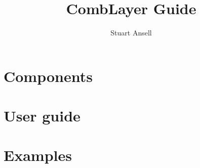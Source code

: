 \documentclass{article}
\title{CombLayer Guide}
\author{Stuart Ansell}
\begin{document}
\maketitle
\tableofcontents
\clearpage
\printnomenclature[2cm]
\clearpage



\newpage








\section{Components}




\section{User guide}



\clearpage

\section{Examples}




\end{document}
